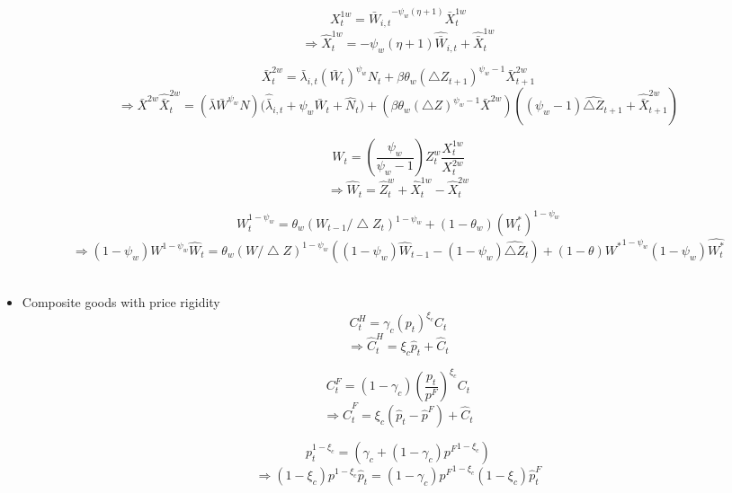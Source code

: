 \documentclass[11pt, a4paper]{article}
\begin{document}
\begin{itemize}
 \[  X_{t}^{1w} ={\bar{W}_{i,t}}^{-\psi_w(\eta +1)} \bar{X}_t^{1w} \]
  \begin{equation} \Rightarrow \widehat{X}_{t}^{1w} = - {\psi_w(\eta+1)}{\widehat{\bar{W}}_{i,t}} +  \widehat{\bar{X}}_t^{1w} \end{equation}
  
\[ \bar{X}_t^{2w} =  {{\bar{\lambda}_{i,t}}  \left({\bar{W}_{t}} \right)^{\psi_w} N_t} + \beta \theta_w { \left({\bigtriangleup Z_{t+1}}\right)^{\psi_w-1}} \bar{X}_{t+1}^{2w} \]
 \begin{equation} \Rightarrow {\bar{X}^{2w}}\widehat{\bar{X}}_t^{2w} = 
  ({{\bar{\lambda}}  {\bar{W}} ^{\psi_w} N})({{\widehat{\bar{\lambda}}_{i,t}}  +\psi_w {\widehat{\bar{W}}_{t}} + \widehat{ N}_t)} + (\beta \theta_w  (\bigtriangleup Z)^{\psi_w -1} \bar{X}^{2w} )( (\psi_w -1)\widehat{\bigtriangleup Z}_{t+1} + \widehat{\bar{X}}_{t+1}^{2w})  \end{equation}
  
 \[W_t = \left(\frac{\psi_w}{\psi_w -1}\right) Z_t^w \frac{X_t^{1w}}{X_t^{2w}}\]
 \begin{equation}\Rightarrow  \widehat{W}_t =  \widehat{Z}_t^w + \widehat{X}_t^{1w} - \widehat{X}_t^{2w} \end{equation}
 
 \[ W_t^{1-\psi_w} = \theta_w (W_{t-1}/\bigtriangleup Z_{t})^{1-\psi_w} + (1-\theta_w)(W_t^*)^{1-\psi_w}\]
 \begin{equation} \Rightarrow (1-\psi_w) W^{1-\psi_w} \widehat{W}_t = \theta_w (W/\bigtriangleup Z)^{1-\psi_w}\left( (1-\psi_w)\widehat{W}_{t-1}  - (1-\psi_w)\widehat{\bigtriangleup Z}_t  \right) + (1-\theta){W^*}^{1-\psi_w}(1-\psi_w)\widehat{W_t^*} \end{equation}
 ~\\

 \item Composite goods with price rigidity
 \[C_t^H = \gamma_c (p_t)^{\xi_c} C_t  \]
 \begin{equation}
 \Rightarrow \widehat{C}_t^H = \xi_c \widehat{p}_t + \widehat{C}_t
 \end{equation}
 
  \[C_t^F = (1-\gamma_c) \left(\frac{p_t}{p^F}\right)^{\xi_c} C_t  \]
 \begin{equation}
 \Rightarrow \widehat{C}_t^F = \xi_c (\widehat{p}_t -\widehat{p}^F) + \widehat{C}_t
 \end{equation}
 
 \[p_t^{1-\xi_c} = \left(\gamma_c + (1-\gamma_c){p^F}^{1-\xi_c}\right) \]
 \begin{equation}
 \Rightarrow (1-\xi_c){p^{1-\xi_c}} \widehat{p}_t = (1-\gamma_c){p^F}^{1-\xi_c} (1-\xi_c)\widehat{p}_t^F
 \end{equation}



\end{itemize}
\end{document}
